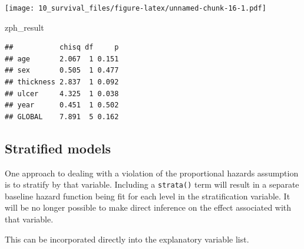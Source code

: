 \documentclass[
  12pt,
  krantz2]{krantz}
\makeatletter
\newenvironment{Shaded}{\begin{snugshade}}{\end{snugshade}}
\newcommand{\DataTypeTok}[1]{\textcolor[rgb]{0.13,0.29,0.53}{#1}}
\newcommand{\DecValTok}[1]{\textcolor[rgb]{0.00,0.00,0.81}{#1}}
\newcommand{\KeywordTok}[1]{\textcolor[rgb]{0.13,0.29,0.53}{\textbf{#1}}}
\newcommand{\NormalTok}[1]{#1}
\newcommand{\OperatorTok}[1]{\textcolor[rgb]{0.81,0.36,0.00}{\textbf{#1}}}
\newcommand{\StringTok}[1]{\textcolor[rgb]{0.31,0.60,0.02}{#1}}
\newenvironment{kframe}{%
\medskip{}
\setlength{\fboxsep}{.8em}
 \def\at@end@of@kframe{}%
 \ifinner\ifhmode%
  \def\at@end@of@kframe{\end{minipage}}%
  \begin{minipage}{\columnwidth}%
 \fi\fi%
 \def\FrameCommand##1{\hskip\@totalleftmargin \hskip-\fboxsep
 \colorbox{shadecolor}{##1}\hskip-\fboxsep
     \hskip-\linewidth \hskip-\@totalleftmargin \hskip\columnwidth}%
 \MakeFramed {\advance\hsize-\width
   \@totalleftmargin\z@ \linewidth\hsize
   \@setminipage}}%
 {\par\unskip\endMakeFramed%
 \at@end@of@kframe}
\renewenvironment{Shaded}{\begin{kframe}}{\end{kframe}}
\makeatother
\begin{document}
\begin{Shaded}
\end{Shaded}

\texttt{[image: 10\_survival\_files/figure-latex/unnamed-chunk-16-1.pdf]}

\begin{Shaded}
\begin{Highlighting}[]
\NormalTok{zph_result}
\end{Highlighting}
\end{Shaded}

\begin{verbatim}
##           chisq df     p
## age       2.067  1 0.151
## sex       0.505  1 0.477
## thickness 2.837  1 0.092
## ulcer     4.325  1 0.038
## year      0.451  1 0.502
## GLOBAL    7.891  5 0.162
\end{verbatim}


\hypertarget{stratified-models}{%
\subsection{Stratified models}\label{stratified-models}}


One approach to dealing with a violation of the proportional hazards assumption is to stratify by that variable.
Including a \texttt{strata()} term will result in a separate baseline hazard function being fit for each level in the stratification variable. It will be no longer possible to make direct inference on the effect associated with that variable.

This can be incorporated directly into the explanatory variable list.
\end{document}
